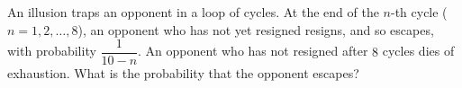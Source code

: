 An illusion traps an opponent in a loop of cycles. At the end of the $n$-th cycle ($n=1,2,\dots,8$), an opponent who has not yet resigned resigns, and so escapes, with probability $\dfrac{1}{10-n}$. An opponent who has not resigned after $8$ cycles dies of exhaustion. What is the probability that the opponent escapes?
